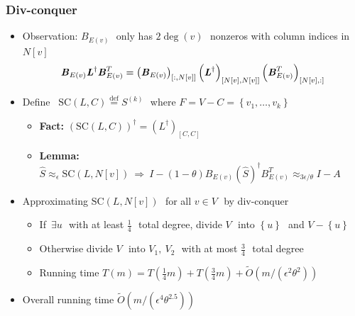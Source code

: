 \documentclass[12pt]{beamer}
\def\defeq{\stackrel{\mathrm{def}}{=}}
\def\setof#1{\left\{#1  \right\}}
\def\eps{\epsilon}
\renewcommand\AA{\boldsymbol{\mathit{A}}}
\newcommand\BB{\boldsymbol{\mathit{B}}}
\newcommand\II{\boldsymbol{\mathit{I}}}
\newcommand\LL{\boldsymbol{\mathit{L}}}
\renewcommand\SS{\boldsymbol{\mathit{S}}}
\newcommand{\kh}[1]{\left(#1\right)}
\begin{document}
\begin{spacing}{1.3}
\begin{frame}
	\frametitle{Div-conquer}
	\vspace{20pt}
	\begin{itemize}
		\item \footnotesize Observation:
			\scriptsize$\BB_{E(v)}$\,\footnotesize\ only has
			\scriptsize$2\deg(v)$\,\footnotesize\ nonzeros with column indices in
			\scriptsize$N[v]$\,\footnotesize\ 
			\scriptsize
			\vspace{-5pt}
			\[
				\vspace{-5pt}
				\BB_{E(v)} \LL^\dag \BB_{E(v)}^T = \kh{\BB_{E(v)}}_{[:, N[v]]}
				\kh{\LL^\dag}_{[N[v], N[v]]} \kh{\BB_{E(v)}^T}_{[N[v], :]}
			\]
			\footnotesize
		\item Define \,%
			\scriptsize$\mathrm{SC}(\LL,C) \defeq \SS^{(k)}$\,\footnotesize\ where
			\scriptsize$F = V - C = \setof{v_1, \ldots, v_k}$\,\footnotesize\ 
			\begin{itemize}
				\item {\textbf{Fact:}}\quad 
				\scriptsize$\kh{\mathrm{SC}(\LL,C)}^\dag = \kh{\LL^\dag}_{[C,C]}$\,\footnotesize\ 
				\item {\textbf{Lemma:}}\ \scriptsize$\hat{\SS} \approx_{\eps} \mathrm{SC}(\LL, N[v]) %
					\ \Rightarrow \ \II - (1 - \theta)\BB_{E(v)}(\hat{\SS})^\dag \BB_{E(v)}^T \approx_{3\eps/\theta} \II - \AA$\,\footnotesize\ 
			\end{itemize}
		\item Approximating \scriptsize$\mathrm{SC}(\LL,N[v])$\,\footnotesize\ for all 
			\scriptsize$v \in V$\,\footnotesize\ by div-conquer
			\begin{itemize}
				\item If\, \scriptsize$\exists u$\,\footnotesize\ with at least \scriptsize$\frac{1}{4}$\,\footnotesize\  total degree,
					divide \scriptsize$V$\,\footnotesize\ into \scriptsize$\setof{u}$\,\footnotesize\ and
					\scriptsize$V - \setof{u}$\,\footnotesize\ 
				\item Otherwise divide \scriptsize$V$\,\footnotesize\  into
				\scriptsize$V_1,\ V_2$\,\footnotesize\ with at most \scriptsize$\frac{3}{4}$\,\footnotesize\  total degree
				\item Running time \scriptsize$T(m) = T(\frac{1}{4} m) + T(\frac{3}{4} m) + \widetilde{O}\kh{m/\kh{\eps^2\theta^2}}$\footnotesize
			\end{itemize}
			\item \footnotesize Overall running time \scriptsize$\widetilde{O}\kh{m/\kh{\eps^4\theta^{2.5}}}$\,\footnotesize\ 
	\end{itemize}
\end{frame}


\end{spacing}
\end{document}
